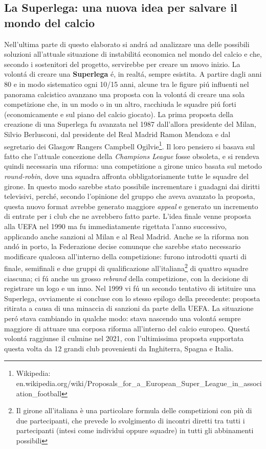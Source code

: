 \documentclass[
    corpo=12pt,
    oneside,
    evenboxes,
    tipotesi=triennale,
    stile=classica,
    oldstyle,
    autoretitolo,
    greek,
]{toptesi}
\begin{document}
\begin{interlinea}{1.5}
\chapter{La Superlega: una nuova idea per salvare il mondo del calcio}
Nell'ultima parte di questo elaborato si andr\'a ad analizzare una delle possibili soluzioni all'attuale situazione di 
instabilit\'a economica nel mondo del calcio e che, secondo i sostenitori del progetto, servirebbe per creare un nuovo inizio.
La volont\'a di creare una \textbf{Superlega} \'e, in realt\'a, sempre esistita. A partire dagli anni 80 e in modo sistematico ogni 10/15 
anni, alcune tra le figure pi\'u influenti nel panorama calcistico avanzano una proposta con la volont\'a di creare una sola competizione che,
in un modo o in un altro, racchiuda le squadre pi\'u forti (economicamente e sul piano del calcio giocato).\newline
La prima proposta della creazione di una Superlega fu avanzata nel 1987 dall'allora presidente del Milan, Silvio Berlusconi, dal presidente
del Real Madrid Ramon Mendoza e dal segretario dei Glasgow Rangers Campbell Ogilvie\footnote{Wikipedia: \newline en.wikipedia.org/wiki/Proposals\_for\_a\_European\_Super\_League\_in\_association\_football}.
Il loro pensiero si basava sul fatto che l'attuale concezione della \emph{Champions League} fosse obsoleta, e si rendeva quindi necessaria una riforma:
una competizione a girone unico basata sul metodo \emph{round-robin}, dove una squadra affronta obbligatoriamente tutte le squadre del girone. 
In questo modo sarebbe stato possibile incrementare i guadagni dai diritti televisivi, perch\'e, secondo l'opinione del gruppo che aveva 
avanzato la \linebreak proposta, questa nuovo format avrebbe generato maggiore \emph{appeal} e generato un incremento di entrate per i club che 
ne avrebbero fatto parte. L'idea finale venne proposta alla UEFA nel 1990 ma fu immediatamente rigettata l'anno successivo, applicando anche 
sanzioni al Milan e al Real Madrid. Anche se la riforma non and\'o in porto, la Federazione decise comunque che sarebbe stato necessario modificare
qualcosa all'interno della competizione: furono introdotti quarti di finale, semifinali e due gruppi di qualificazione all'italiana\footnote{Il girone all'italiana è una particolare formula delle competizioni con più di due partecipanti, che prevede lo svolgimento di incontri diretti tra tutti i partecipanti (intesi come individui oppure squadre) in tutti gli abbinamenti possibili}
di quattro squadre ciascuna; ci f\'u anche un grosso \emph{rebrand} della competizione, con la decisione di registrare un logo e un inno.\newline
Nel 1999 vi f\'u un secondo tentativo di istituire una Superlega, ovviamente si concluse con lo stesso epilogo della precedente: proposta 
ritirata a causa di una minaccia di sanzioni da parte della UEFA. La situazione per\'o stava cambiando in qualche modo: 
stava nascendo una volont\'a sempre maggiore di attuare una corposa riforma all'interno del calcio europeo. Quest\'a volont\'a raggiunse il culmine
nel 2021, con l'ultimissima proposta supportata questa volta da 12 grandi club provenienti da Inghiterra, Spagna e Italia. 

\end{interlinea}
\end{document}
